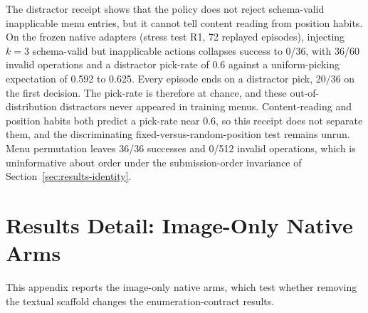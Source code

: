 The distractor receipt shows that the policy does not reject schema-valid inapplicable menu entries, but it cannot tell content reading from position habits. On the frozen native adapters (stress test R1, 72 replayed episodes), injecting $k{=}3$ schema-valid but inapplicable actions collapses success to 0/36, with 36/60 invalid operations and a distractor pick-rate of 0.6 against a uniform-picking expectation of 0.592 to 0.625. Every episode ends on a distractor pick, 20/36 on the first decision. The pick-rate is therefore at chance, and these out-of-distribution distractors never appeared in training menus. Content-reading and position habits both predict a pick-rate near 0.6, so this receipt does not separate them, and the discriminating fixed-versus-random-position test remains unrun. Menu permutation leaves 36/36 successes and 0/512 invalid operations, which is uninformative about order under the submission-order invariance of Section~\ref{sec:results-identity}.

\section{Results Detail: Image-Only Native Arms}
\label{app:results-native}
\label{sec:results-native}

This appendix reports the image-only native arms, which test whether removing the textual scaffold changes the enumeration-contract results.

